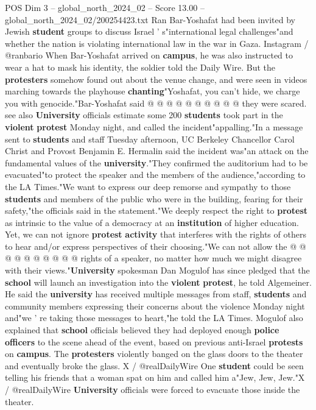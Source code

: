 \begin{textsample}{POS Dim 3 – global\_north\_2024\_02 – Score 13.00 – global\_north\_2024\_02/200254423.txt}
Ran Bar-Yoshafat had been invited by Jewish \textbf{student} groups to discuss Israel ' s"international legal challenges"and whether the nation is violating international law in the war in Gaza.
Instagram / @ranbario When Bar-Yoshafat arrived on \textbf{campus}, he was also instructed to wear a hat to mask his identity, the soldier told the Daily Wire.
But the \textbf{protesters} somehow found out about the venue change, and were seen in videos marching towards the playhouse \textbf{chanting}"Yoshafat, you can't hide, we charge you with genocide."Bar-Yoshafat said @ @ @ @ @ @ @ @ @ @ they were scared. see also \textbf{University} officials estimate some 200 \textbf{students} took part in the \textbf{violent} \textbf{protest} Monday night, and called the incident"appalling."In a message sent to \textbf{students} and staff Tuesday afternoon, UC Berkeley Chancellor Carol Christ and Provost Benjamin E.
Hermalin said the incident was"an attack on the fundamental values of the \textbf{university}."They confirmed the auditorium had to be evacuated"to protect the speaker and the members of the audience,"according to the LA Times."We want to express our deep remorse and sympathy to those \textbf{students} and members of the public who were in the building, fearing for their safety,"the officials said in the statement."We deeply respect the right to \textbf{protest} as intrinsic to the value of a democracy at an \textbf{institution} of higher education.
Yet, we can not ignore \textbf{protest} \textbf{activity} that interferes with the rights of others to hear and/or express perspectives of their choosing."We can not allow the @ @ @ @ @ @ @ @ @ @ rights of a speaker, no matter how much we might disagree with their views."\textbf{University} spokesman Dan Mogulof has since pledged that the \textbf{school} will launch an investigation into the \textbf{violent} \textbf{protest}, he told Algemeiner.
He said the \textbf{university} has received multiple messages from staff, \textbf{students} and community members expressing their concerns about the violence Monday night and"we ' re taking those messages to heart,"he told the LA Times.
Mogulof also explained that \textbf{school} officials believed they had deployed enough \textbf{police} \textbf{officers} to the scene ahead of the event, based on previous anti-Israel \textbf{protests} on \textbf{campus}.
The \textbf{protesters} violently banged on the glass doors to the theater and eventually broke the glass.
X / @realDailyWire One \textbf{student} could be seen telling his friends that a woman spat on him and called him a"Jew, Jew, Jew."X / @realDailyWire \textbf{University} officials were forced to evacuate those inside the theater.

\end{textsample}
